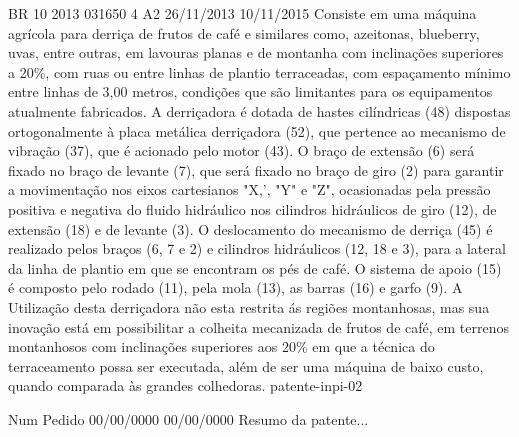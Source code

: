 {BR 10 2013 031650 4 A2}%
{26/11/2013}%
{10/11/2015}%
{Consiste em uma máquina agrícola para derriça de frutos de café e similares
  como, azeitonas, blueberry, uvas, entre outras, em lavouras planas e de
  montanha com inclinações superiores a 20\%, com ruas ou entre linhas de
  plantio terraceadas, com espaçamento mínimo entre linhas de 3,00 metros,
  condições que são limitantes para os equipamentos atualmente fabricados. A
  derriçadora é dotada de hastes cilíndricas (48) dispostas ortogonalmente à
  placa metálica derriçadora (52), que pertence ao mecanismo de vibração (37),
  que é acionado pelo motor (43). O braço de extensão (6) será fixado no braço
  de levante (7), que será fixado no braço de giro (2) para garantir a
  movimentação nos eixos cartesianos "X,', "Y" e "Z", ocasionadas pela pressão
  positiva e negativa do fluido hidráulico nos cilindros hidráulicos de giro
  (12), de extensão (18) e de levante (3). O deslocamento do mecanismo de
  derriça (45) é realizado pelos braços (6, 7 e 2) e cilindros hidráulicos (12,
  18 e 3), para a lateral da linha de plantio em que se encontram os pés de
  café. O sistema de apoio (15) é composto pelo rodado (11), pela mola (13), as
  barras (16) e garfo (9). A Utilização desta derriçadora não esta restrita ás
  regiões montanhosas, mas sua inovação está em possibilitar a colheita
  mecanizada de frutos de café, em terrenos montanhosos com inclinações
  superiores aos 20\% em que a técnica do terraceamento possa ser executada,
  além de ser uma máquina de baixo custo, quando comparada às grandes
  colhedoras.}%
{patente-inpi-02}%

{Num Pedido}%
{00/00/0000}%
{00/00/0000}%
{Resumo da patente...}%
{}%

